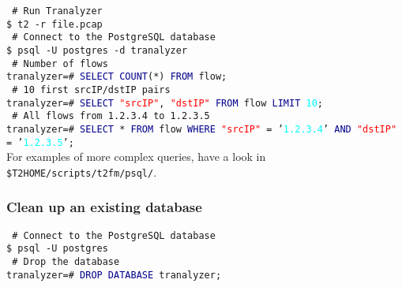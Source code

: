 \documentclass[documentation]{subfiles}
\begin{document}
{\tt\color{blue} \# Run Tranalyzer}\\
{\tt \$ t2 -r file.pcap}\\

\noindent
{\tt\color{blue} \# Connect to the PostgreSQL database}\\
{\tt \$ psql -U postgres -d tranalyzer}\\

\noindent
{\tt\color{blue} \# Number of flows}\\
{\tt tranalyzer=\# \textcolor{darkblue}{SELECT COUNT}(*) \textcolor{darkblue}{FROM} flow;}\\

\noindent
{\tt\color{blue} \# 10 first srcIP/dstIP pairs}\\
{\tt tranalyzer=\# \textcolor{darkblue}{SELECT} \textcolor{red}{"srcIP"}, \textcolor{red}{"dstIP"} \textcolor{darkblue}{FROM} flow \textcolor{darkblue}{LIMIT} \textcolor{cyan}{10};}\\

\noindent
{\tt\color{blue} \# All flows from 1.2.3.4 to 1.2.3.5}\\
{\tt tranalyzer=\# \textcolor{darkblue}{SELECT} * \textcolor{darkblue}{FROM} flow \textcolor{darkblue}{WHERE} \textcolor{red}{"srcIP"} = '\textcolor{cyan}{1.2.3.4}' \textcolor{darkblue}{AND} \textcolor{red}{"dstIP"} = '\textcolor{cyan}{1.2.3.5}';}\\

\noindent
For examples of more complex queries, have a look in {\tt \$T2HOME/scripts/t2fm/psql/}.

\subsubsection{Clean up an existing database}

{\tt\color{blue} \# Connect to the PostgreSQL database}\\
{\tt \$ psql -U postgres}\\

\noindent
{\tt\color{blue} \# Drop the database}\\
{\tt tranalyzer=\# \textcolor{darkblue}{DROP DATABASE} tranalyzer;}\\
\end{document}
